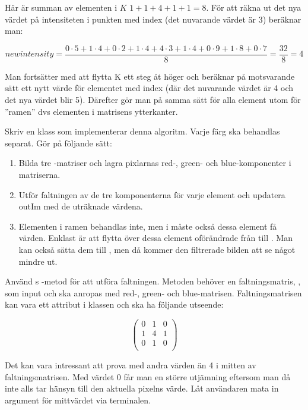Här är summan av elementen i $K$ $1+1+4+1+1 = 8$. För att räkna ut det nya värdet på intensiteten i punkten med index  (det nuvarande värdet är 3) beräknar man:

\begin{displaymath}
\mathit{newintensity} = \frac{0 \cdot 5 + 1 \cdot 4 + 0 \cdot 2 + 1 \cdot 4 + 4 \cdot 3 + 1 \cdot 4 + 0 \cdot 9 + 1 \cdot 8 + 0 \cdot 7}{8} = \frac{32}{8} = 4
\end{displaymath}


Man fortsätter med att flytta K ett steg åt höger och beräknar på motsvarande sätt ett nytt värde för elementet med index  (där det nuvarande värdet är 4 och det nya värdet blir 5). Därefter gör man på samma sätt för alla element utom för ”ramen” dvs elementen i matrisens ytterkanter.

Skriv en klass  som implementerar denna algoritm. Varje färg ska behandlas separat. Gör på följande sätt:
\begin{enumerate}
	\item Bilda tre -matriser och lagra pixlarnas red-, green- och blue-komponenter i matriserna.
	\item Utför faltningen av de tre komponenterna för varje element och updatera outIm med de uträknade värdena.
	\item Elementen i ramen behandlas inte, men i  måste också dessa element få värden. Enklast är att flytta över dessa element oförändrade från  till . Man kan också sätta dem till , men då kommer den filtrerade bilden att se något mindre ut.
\end{enumerate}

Använd s -metod för att utföra faltningen. Metoden behöver en faltningsmatris, , som input och ska anropas med red-, green- och blue-matrisen. Faltningsmatrisen kan vara ett attribut i klassen och ska ha följande utseende:

\begin{displaymath}
\begin{pmatrix}
  0 & 1 & 0 \\
  1 & 4 & 1 \\
  0 & 1 & 0 \\
\end{pmatrix}
\end{displaymath}

Det kan vara intressant att prova med andra värden än 4 i mitten av faltningsmatrisen. Med värdet 0 får man en större utjämning eftersom man då inte alls tar hänsyn till den aktuella pixelns värde. Låt användaren mata in argument för mittvärdet via terminalen.

